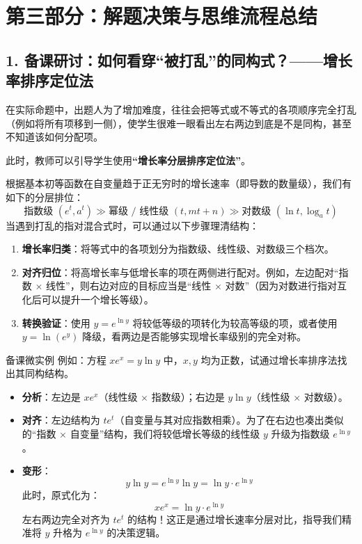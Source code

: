 \documentclass[11pt,a4paper]{ctexart}
\begin{document}
\newpage

\section{第三部分：解题决策与思维流程总结}

\subsection{1. 备课研讨：如何看穿“被打乱”的同构式？——增长率排序定位法}

在实际命题中，出题人为了增加难度，往往会把等式或不等式的各项顺序完全打乱（例如将所有项移到一侧），使学生很难一眼看出左右两边到底是不是同构，甚至不知道该如何分配项。

此时，教师可以引导学生使用\textbf{“增长率分层排序定位法”}。

根据基本初等函数在自变量趋于正无穷时的增长速率（即导数的数量级），我们有如下的分层排位：
\[
\text{指数级 } (e^t, a^t) \gg \text{幂级 / 线性级 } (t, mt+n) \gg \text{对数级 } (\ln t, \log_a t)
\]
当遇到打乱的指对混合式时，可以通过以下步骤理清结构：
\begin{enumerate}
  \item \textbf{增长率归类}：将等式中的各项划分为指数级、线性级、对数级三个档次。
  \item \textbf{对齐归位}：将高增长率与低增长率的项在两侧进行配对。例如，左边配对“指数 $\times$ 线性”，则右边对应的目标应当是“线性 $\times$ 对数”（因为对数进行指对互化后可以提升一个增长等级）。
  \item \textbf{转换验证}：使用 $y = e^{\ln y}$ 将较低等级的项转化为较高等级的项，或者使用 $y = \ln(e^y)$ 降级，看两边是否能够实现增长率级别的完全对称。
\end{enumerate}

\begin{teachbox}{备课微实例}
例如：方程 $x e^x = y \ln y$ 中，$x, y$ 均为正数，试通过增长率排序法找出其同构结构。
\begin{itemize}
  \item \textbf{分析}：左边是 $x e^x$（线性级 $\times$ 指数级）；右边是 $y \ln y$（线性级 $\times$ 对数级）。
  \item \textbf{对齐}：左边结构为 $t e^t$（自变量与其对应指数相乘）。为了在右边也凑出类似的“指数 $\times$ 自变量”结构，我们将较低增长等级的线性级 $y$ 升级为指数级 $e^{\ln y}$。
  \item \textbf{变形}：
    \[
    y \ln y = e^{\ln y} \ln y = \ln y \cdot e^{\ln y}
    \]
    此时，原式化为：
    \[
    x e^x = \ln y \cdot e^{\ln y}
    \]
    左右两边完全对齐为 $t e^t$ 的结构！这正是通过增长速率分层对比，指导我们精准将 $y$ 升格为 $e^{\ln y}$ 的决策逻辑。
\end{itemize}
\end{teachbox}
\end{document}
